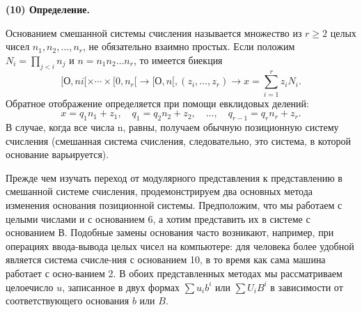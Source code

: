 \documentclass{mai_book}
\begin{document}
\textbf{(10) Определение.}
\vspace{2mm}
\par
Основанием смешанной системы счисления называется множество \linebreak
из $r\geq2$ целых чисел $n_1, n_2,\ldots, n_r$, не обязательно взаимно простых.\linebreak
Если положим $N_i = \prod_{j<i}n_j$ и $n=n_1 n_2\ldots n_r$, то имеется биекция
$$[О, ni[\times \cdots \times [0, n_r[\rightarrow[О, n[, (z_i,\ldots, z_r)\rightarrow x = \sum\limits^{r}_{i=1}z_iN_i.$$
Обратное отображение определяется при помощи евклидовых делений:
$$x = q_1n_1 + z_1,\quad q_1 = q_2n_2 + z_2,\quad \ldots,\quad q_{r-1} = q_rn_r + z_r.$$
В случае, когда все числа n, равны, получаем обычную позиционную
систему счисления (смешанная система счисления, следовательно, это
система, в которой основание варьируется). 
\vspace{3mm}
\par
Прежде чем изучать переход от модулярного представления к 
представлению в смешанной системе счисления, продемонстрируем два 
основных метода изменения основания позиционной системы. 
Предположим, что мы работаем с целыми числами и с основанием 6, а хотим \linebreak
представить их в системе с основанием В. Подобные замены основания
часто возникают, например, при операциях ввода-вывода целых чисел \linebreak
на компьютере: для человека более удобной является система 
счисле-\linebreak ния с основанием 10, в то время как сама машина работает с 
осно-\linebreak ванием 2. В обоих представленных методах мы рассматриваем целое\linebreak число $u$, записанное в двух формах $\sum u_{i}b^{i}$ или $\sum U_{i}B^{i}$ в зависимости \linebreak
от соответствующего основания $b$ или $B$.

\newpage
\end{document}
